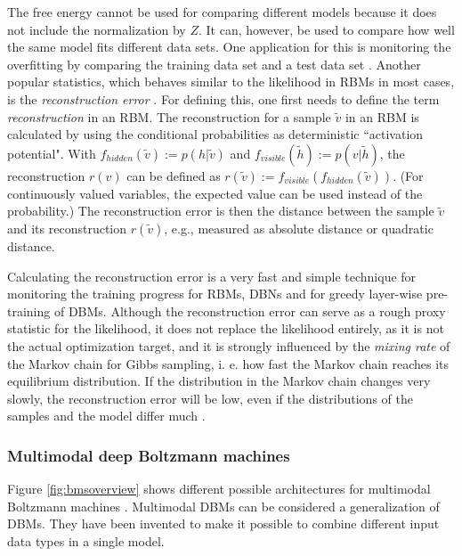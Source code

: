\documentclass[12pt]{article}
\begin{document}
The free energy cannot be used for comparing different models because it does not include the normalization by $Z$.
It can, however, be used to compare how well the same model fits different data sets.
One application for this is monitoring the overfitting by comparing the training data set and a test data set \citep{hinton_practical_2012}.
\label{reconstructionerror}
Another popular statistics, which behaves similar to the likelihood in RBMs in most cases, is the {\em reconstruction error} \citep{hinton_practical_2012}.
For defining this, one first needs to define the term {\em reconstruction} in an RBM.
The reconstruction \citep{hinton_practical_2012} for a sample $\tilde{v}$ in an RBM is calculated by using the conditional probabilities as deterministic ``activation potential".
With $f_{hidden}(\tilde{v}) := p(h|\tilde{v})$ and $f_{visible}(\tilde{h}) :=  p(v|\tilde{h})$, the reconstruction $r(v)$ can be defined as $r(\tilde{v}) := f_{visible}(f_{hidden}(\tilde{v}))$.
(For continuously valued variables, the expected value can be used instead of the probability.)
The reconstruction error is then the distance between the sample $\tilde{v}$ and its reconstruction $r(\tilde{v})$, e.g., measured as absolute distance or quadratic distance.

Calculating the reconstruction error  is a very fast and simple technique for monitoring the training progress for RBMs, DBNs and for greedy layer-wise pre-training of DBMs.
Although the reconstruction error can serve as a rough proxy statistic for the likelihood, it does not replace the likelihood entirely, as it is not the actual optimization target, and it is strongly influenced by the {\em mixing rate} of the Markov chain for Gibbs sampling, i. e. how fast the Markov chain reaches its equilibrium distribution. If the distribution in the Markov chain changes very slowly, the reconstruction error will be low, even if the distributions of the samples and the model differ much \citep{hinton_practical_2012}.

\subsubsection{Multimodal deep Boltzmann machines}

Figure \ref{fig:bmsoverview} shows different possible architectures for multimodal Boltzmann machines \citep{srivastava2012multimodal}.
Multimodal DBMs can be considered a generalization of DBMs.
They have been invented to make it possible to combine different input data types in a single model.
\end{document}
